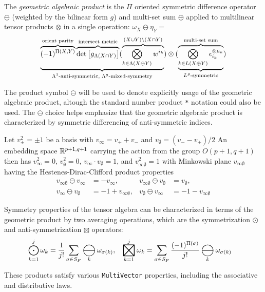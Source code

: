 \documentclass{juliacon}
\DeclareMathOperator*{\bigboxtimes}{\scalerel*{\boxtimes}{\bigodot}}
\DeclareMathOperator*{\bigominus}{\scalerel*{\ominus}{\bigodot}}
\begin{document}
\begin{definition}
	The \textit{geometric algebraic product} is the $\Pi$ oriented symmetric difference operator $\ominus$ (weighted by the bilinear form $g$) and multi-set sum $\oplus$ applied to multilinear tensor products $\otimes$ in a single operation:
	$ \omega_X\ominus \eta_Y = $
	$$\ub{\text{$\Lambda^1$-anti-symmetric, $\Lambda^g$-mixed-symmetry}}{\ob{\text{orient parity}}{(-1)^{\Pi(X,Y)}}\ob{\text{intersect metric}}{\det\mat{g_{\Lambda(X\cap Y)}}} (\ob{(X\cup Y)\bs(X\cap Y)}{\bigotimes_{k\in \Lambda(X\ominus Y)} w^{i_k}}})\otimes (\ub{\text{$L^g$-symmetric}}{\ob{\text{multi-set sum}}{\bigotimes_{k\in L(X\oplus Y)} \epsilon_{i_k}^{\otimes\mu_k}}})$$
\end{definition}

\begin{remark}
	The product symbol $\ominus$ will be used to denote explicitly usage of the geometric algebraic product, altough the standard number product \verb`*` notation could also be used.
	The $\ominus$ choice helps emphasize that the geometric algebraic product is characterized by symmetric differencing of anti-symmetric indices.
\end{remark}

\begin{definition}
	Let $v_\pm^2 = \pm1$ be a basis with $v_\infty = v_++v_-$ and $v_\emptyset = (v_--v_+)/2$
An embedding space $\mb R^{p+1,q+1}$ carrying the action from the group $O(p+1,q+1)$ then has
$v_\infty^2 =0$, $v_\emptyset^2 =0$,
$v_\infty \cdot v_\emptyset = 1$,  and $v_{\infty\emptyset}^2 = 1$ with
Minkowski plane $v_{\infty\emptyset}$ having the Hestenes-Dirac-Clifford product properties
\begin{align*}
	v_{\infty\emptyset}\ominus v_\infty &= -v_\infty, &  v_{\infty\emptyset}\ominus v_\emptyset &= v_\emptyset, \\
	v_\infty\ominus v_\emptyset &= -1 + v_{\infty\emptyset}, & v_\emptyset\ominus v_\infty &=  -1 - v_{\infty\emptyset}
\end{align*}
\end{definition}
\begin{definition}
	Symmetry properties of the tensor algebra can be characterized in terms of the geometric product by two averaging operations, which are the symmetrization $\odot$ and anti-symmetrization $\boxtimes$ operators:
	\begin{align*}
		\bigodot_{k=1}^j \omega_k &= \frac1{j!}\sum_{\sigma\in S_P}\bigominus_k\omega_{\sigma(k)}, &
		\bigboxtimes_{k=1}^j \omega_k &= \sum_{\sigma\in S_P}\frac{(-1)^{\Pi(\sigma)}}{j!}\bigominus_k\omega_{\sigma(k)}
	\end{align*}
\end{definition}
These products satisfy various \verb`MultiVector` properties, including the associative and distributive laws.
\end{document}
